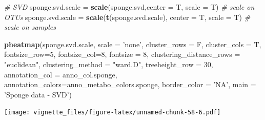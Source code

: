 \documentclass[]{book}
\newenvironment{Shaded}{\begin{snugshade}}{\end{snugshade}}
\newcommand{\KeywordTok}[1]{\textcolor[rgb]{0.13,0.29,0.53}{\textbf{#1}}}
\newcommand{\DataTypeTok}[1]{\textcolor[rgb]{0.13,0.29,0.53}{#1}}
\newcommand{\DecValTok}[1]{\textcolor[rgb]{0.00,0.00,0.81}{#1}}
\newcommand{\StringTok}[1]{\textcolor[rgb]{0.31,0.60,0.02}{#1}}
\newcommand{\CommentTok}[1]{\textcolor[rgb]{0.56,0.35,0.01}{\textit{#1}}}
\newcommand{\NormalTok}[1]{#1}
\begin{document}
\begin{Shaded}
\begin{Highlighting}[]
\CommentTok{# SVD}
\NormalTok{sponge.svd.scale =}\StringTok{ }\KeywordTok{scale}\NormalTok{(sponge.svd,}\DataTypeTok{center =}\NormalTok{ T, }\DataTypeTok{scale =}\NormalTok{ T) }\CommentTok{# scale on OTUs}
\NormalTok{sponge.svd.scale =}\StringTok{ }\KeywordTok{scale}\NormalTok{(}\KeywordTok{t}\NormalTok{(sponge.svd.scale), }\DataTypeTok{center =}\NormalTok{ T, }\DataTypeTok{scale =}\NormalTok{ T) }\CommentTok{# scale on samples}

\KeywordTok{pheatmap}\NormalTok{(sponge.svd.scale, }
         \DataTypeTok{scale =} \StringTok{'none'}\NormalTok{, }
         \DataTypeTok{cluster_rows =}\NormalTok{ F, }
         \DataTypeTok{cluster_cols =}\NormalTok{ T, }
         \DataTypeTok{fontsize_row=}\DecValTok{5}\NormalTok{, }\DataTypeTok{fontsize_col=}\DecValTok{8}\NormalTok{,}
         \DataTypeTok{fontsize =} \DecValTok{8}\NormalTok{,}
         \DataTypeTok{clustering_distance_rows =} \StringTok{"euclidean"}\NormalTok{,}
         \DataTypeTok{clustering_method =} \StringTok{"ward.D"}\NormalTok{,}
         \DataTypeTok{treeheight_row =} \DecValTok{30}\NormalTok{,}
         \DataTypeTok{annotation_col =}\NormalTok{ anno_col.sponge,}
         \DataTypeTok{annotation_colors=}\NormalTok{anno_metabo_colors.sponge,}
         \DataTypeTok{border_color =} \StringTok{'NA'}\NormalTok{,}
         \DataTypeTok{main =} \StringTok{'Sponge data - SVD'}\NormalTok{)}
\end{Highlighting}
\end{Shaded}

\texttt{[image: vignette\_files/figure-latex/unnamed-chunk-58-6.pdf]}
\end{document}
